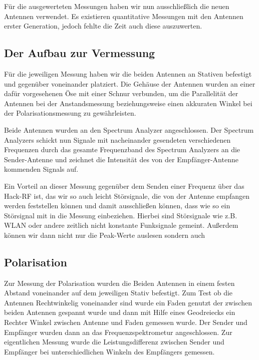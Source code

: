 \documentclass[titlepage,11pt,a4paper,ngerman]{article}
\begin{document}
Für die ausgewerteten Messungen haben wir nun ausschließlich die neuen Antennen verwendet. Es existieren quantitative Messungen mit den Antennen erster Generation, jedoch fehlte die Zeit auch diese auszuwerten.

\subsection{Der Aufbau zur Vermessung}

Für die jeweiligen Messung haben wir die beiden Antennen an Stativen befestigt und gegenüber voneinander platziert. Die Gehäuse der Antennen wurden an einer dafür vorgesehenen Öse mit einer Schnur verbunden, um die Parallelität der Antennen bei der Anstandsmessung beziehungsweise einen akkuraten Winkel bei der Polarisationsmessung zu gewährleisten.\par
Beide Antennen wurden an den Spectrum Analyzer angeschlossen. Der Spectrum Analyzers schickt nun Signale mit nacheinander gesendeten verschiedenen Frequenzen durch das gesamte Frequenzband des Spectrum Analyzers an die Sender-Antenne und zeichnet die Intensität des von der Empfänger-Antenne kommenden Signals auf.\par
Ein Vorteil an dieser Messung gegenüber dem Senden einer Frequenz über das Hack-RF ist, das wir so auch leicht Störsignale, die von der Antenne empfangen werden feststellen können und damit ausschließen können, dass wie so ein Störsignal mit in die Messung einbeziehen. Hierbei sind Störsignale wie z.B. WLAN oder andere zeitlich nicht konstante Funksignale gemeint. Außerdem können wir dann nicht nur die Peak-Werte auslesen sondern auch 

\subsection{Polarisation}
Zur Messung der Polarisation wurden die Beiden Antennen in einem festen Abstand voneinander auf dem jeweiligen Stativ befestigt. Zum Test ob die Antennen Rechtwinkelig voneinander sind wurde ein Faden genutzt der zwischen beiden Antennen gespannt wurde und dann mit Hilfe eines Geodreiecks ein Rechter Winkel zwischen Antenne und Faden gemessen wurde. Der Sender und Empfänger wurden dann an das Frequenzspektrometur angeschlossen. Zur eigentlichen Messung wurde die Leistungsdifferenz zwischen Sender und Empfänger bei unterschiedlichen Winkeln des Empfängers gemessen.
\end{document}
